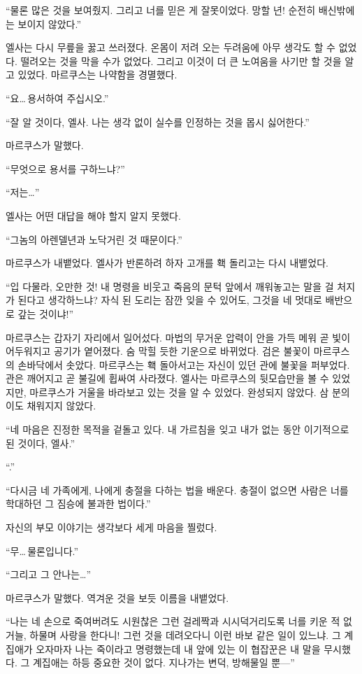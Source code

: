 ``물론 많은 것을 보여줬지. 그리고 너를 믿은 게 잘못이었다. 망할 년! 순전히 배신밖에는 보이지 않았다.''

엘사는 다시 무릎을 꿇고 쓰러졌다. 온몸이 저려 오는 두려움에 아무 생각도 할 수 없었다. 떨려오는 것을 막을 수가 없었다. 그리고 이것이 더 큰 노여움을 사기만 할 것을 알고 있었다. 마르쿠스는 나약함을 경멸했다.

``요\ldots\,용서하여 주십시오.''

``잘 알 것이다, 엘사. 나는 생각 없이 실수를 인정하는 것을 몹시 싫어한다.''

마르쿠스가 말했다.

``무엇으로 용서를 구하느냐?''

``저는\ldots''

엘사는 어떤 대답을 해야 할지 알지 못했다.

``그놈의 아렌델년과 노닥거린 것 때문이다.''

마르쿠스가 내뱉었다. 엘사가 반론하려 하자 고개를 홱 돌리고는 다시 내뱉었다.

``입 다물라, 오만한 것! 내 명령을 비웃고 죽음의 문턱 앞에서 깨워놓고는 말을 걸 처지가 된다고 생각하느냐? 자식 된 도리는 잠깐 잊을 수 있어도, 그것을 네 멋대로 배반으로 갚는 것이냐!''

마르쿠스는 갑자기 자리에서 일어섰다. 마법의 무거운 압력이 안을 가득 메워 곧 빛이 어두워지고 공기가 옅어졌다. 숨 막힐 듯한 기운으로 바뀌었다. 검은 불꽃이 마르쿠스의 손바닥에서 솟았다. 마르쿠스는 홱 돌아서고는 자신이 있던 관에 불꽃을 퍼부었다. 관은 깨어지고 곧 불길에 휩싸여 사라졌다. 엘사는 마르쿠스의 뒷모습만을 볼 수 있었지만, 마르쿠스가 거울을 바라보고 있는 것을 알 수 있었다. 완성되지 않았다. 삼 분의 이도 채워지지 않았다.

``네 마음은 진정한 목적을 겉돌고 있다. 내 가르침을 잊고 내가 없는 동안 이기적으로 된 것이다, 엘사.''

``.''

``다시금 네 가족에게, 나에게 충절을 다하는 법을 배운다. 충절이 없으면 사람은 너를 학대하던 그 짐승에 불과한 법이다.''

자신의 부모 이야기는 생각보다 세게 마음을 찔렀다.

``무\ldots\,물론입니다.''

``그리고 그 안나는\ldots''

마르쿠스가 말했다. 역겨운 것을 보듯 이름을 내뱉었다.

``나는 네 손으로 죽여버려도 시원찮은 그런 걸레짝과 시시덕거리도록 너를 키운 적 없거늘, 하물며 사랑을 한다니! 그런 것을 데려오다니 이런 바보 같은 일이 있느냐. 그 계집애가 오자마자 나는 죽이라고 명령했는데 내 앞에 있는 이 협잡꾼은 내 말을 무시했다. 그 계집애는 하등 중요한 것이 없다. 지나가는 변덕, 방해물일 뿐—''

